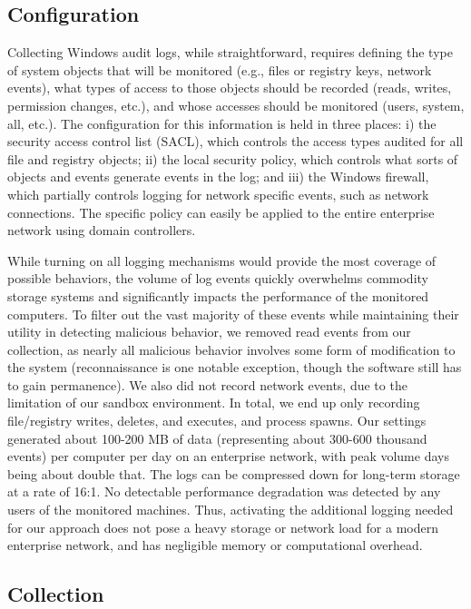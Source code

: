 \documentclass{sig-alternate-2013}
\newcommand{\eg}{e.g.\xspace}
\newcommand{\etc}{etc.\xspace}
\begin{document}
\subsection{Configuration}

Collecting Windows audit logs, while straightforward, requires defining the type of system objects that will be monitored (\eg, files or registry keys, network events), what types of access to those objects should be recorded (reads, writes, permission changes, \etc), and whose accesses should be monitored (users, system, all, \etc). The configuration for this information is held in three places: i) the security access control list (SACL), which controls the access types audited for all file and registry objects; ii) the local security policy, which controls what sorts of objects and events generate events in the log; and iii) the Windows firewall, which partially controls logging for network specific events, such as network connections. The specific policy can easily be applied to the entire enterprise network using domain controllers.

While turning on all logging mechanisms would provide the most coverage of possible behaviors, the volume of log events quickly overwhelms commodity storage systems and significantly impacts the performance of the monitored computers. To filter out the vast majority of these events while maintaining their utility in detecting malicious behavior, we removed read events from our collection, as nearly all malicious behavior involves some form of modification to the system (reconnaissance is one notable exception, though the software still has to gain permanence). We also did not record network events, due to the limitation of our sandbox environment. In total, we end up only recording file/registry writes, deletes, and executes, and process spawns. Our settings generated about 100-200 MB of data (representing about 300-600 thousand events) per computer per day on an enterprise network, with  peak volume days being about double that. The logs can be compressed down for long-term storage at a rate of 16:1.  No detectable performance degradation was detected by any users of the monitored machines. Thus, activating the additional logging needed for our approach does not pose a heavy storage or network load for a modern enterprise network, and has negligible memory or computational overhead.

\subsection{Collection}
\end{document}
